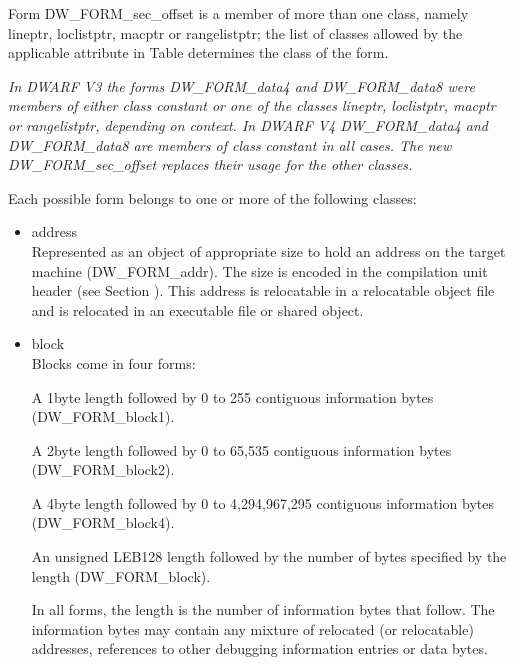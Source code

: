 Form DW\_FORM\_sec\_offset is a member of more than one class,
namely lineptr, loclistptr, macptr or rangelistptr; the list
of classes allowed by the applicable attribute in 
Table 
determines the class of the form.

\textit{In DWARF V3 the forms DW\_FORM\_data4 and DW\_FORM\_data8 were
members of either class constant or one of the classes lineptr,
loclistptr, macptr or rangelistptr, depending on context. In
DWARF V4 DW\_FORM\_data4 and DW\_FORM\_data8 are members of class
constant in all cases. The new DW\_FORM\_sec\_offset replaces
their usage for the other classes.}

Each possible form belongs to one or more of the following classes:

\begin{itemize}
\item address \\
Represented as an object of appropriate size to hold an
address on the target machine (DW\_FORM\_addr). The size is
encoded in the compilation unit header 
(see Section ).
This address is relocatable in a relocatable object file and
is relocated in an executable file or shared object.

\item block \\
Blocks come in four forms:

\begin{myindentpara}{1cm}
A 1\dash byte length followed by 0 to 255 contiguous information
bytes (DW\_FORM\_block1).
\end{myindentpara}

\begin{myindentpara}{1cm}
A 2\dash byte length followed by 0 to 65,535 contiguous information
bytes (DW\_FORM\_block2).
\end{myindentpara}


\begin{myindentpara}{1cm}
A 4\dash byte length followed by 0 to 4,294,967,295 contiguous
information bytes (DW\_FORM\_block4).
\end{myindentpara}


\begin{myindentpara}{1cm}
An unsigned LEB128 length followed by the number of bytes
specified by the length (DW\_FORM\_block).
\end{myindentpara}

In all forms, the length is the number of information bytes
that follow. The information bytes may contain any mixture
of relocated (or relocatable) addresses, references to other
debugging information entries or data bytes.


\end{itemize}
